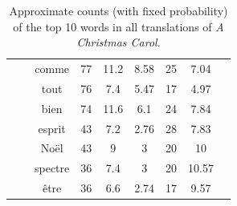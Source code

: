 \documentclass[shortpaper]{revdetua}
\begin{document}
\begin{table}[H]
\begin{tabular}{@{}ccccccccc@{}}
     & \multicolumn{1}{l|}{}   & comme       & 77           & 11.2         & 8.58    & 25      & 7.04              &              \\
     & \multicolumn{1}{l|}{}   & tout        & 76           & 7.4          & 5.47    & 17      & 4.97              &              \\
     & \multicolumn{1}{l|}{}   & bien        & 74           & 11.6         & 6.1     & 24      & 7.84              &              \\
     & \multicolumn{1}{l|}{}   & esprit      & 43           & 7.2          & 2.76    & 28      & 7.83              &              \\
     & \multicolumn{1}{l|}{}   & Noël        & 43           & 9            & 3       & 20      & 10                &              \\
     & \multicolumn{1}{l|}{}   & spectre     & 36           & 7.4          & 3       & 20      & 10.57             &              \\
     & \multicolumn{1}{l|}{}   & être        & 36           & 6.6          & 2.74    & 17      & 9.57              &              \\ \bottomrule
\end{tabular}
\caption{Approximate counts (with fixed probability) of the top 10 words in all translations of \textit{A Christmas Carol}.}
\end{table}
\newpage
\textbf{ }
\newpage
\end{document}
